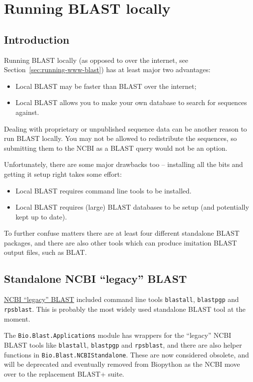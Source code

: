 \documentclass{report}
\begin{document}
\section{Running BLAST locally}
\label{sec:running-local-blast}

\subsection{Introduction}

Running BLAST locally (as opposed to over the internet, see
Section~\ref{sec:running-www-blast}) has at least major two advantages:
\begin{itemize}
\item Local BLAST may be faster than BLAST over the internet;
\item Local BLAST allows you to make your own database to search for sequences against.
\end{itemize}
Dealing with proprietary or unpublished sequence data can be another reason to run BLAST
locally.  You may not be allowed to redistribute the sequences, so submitting them to the
NCBI as a BLAST query would not be an option.

Unfortunately, there are some major drawbacks too -- installing all the bits and getting it setup right takes some effort:
\begin{itemize}
\item Local BLAST requires command line tools to be installed.
\item Local BLAST requires (large) BLAST databases to be setup (and potentially kept up to date).
\end{itemize}

\noindent
To further confuse matters there are at least four different standalone BLAST packages,
and there are also other tools which can produce imitation BLAST output files, such as BLAT.

\subsection{Standalone NCBI ``legacy'' BLAST}

\href{http://blast.ncbi.nlm.nih.gov/Blast.cgi?CMD=Web&PAGE_TYPE=BlastDocs&DOC_TYPE=Download}
{NCBI ``legacy'' BLAST} included command line tools \verb|blastall|, \verb|blastpgp| and
\verb|rpsblast|. This is probably the most widely used standalone BLAST tool at the moment.

The \verb|Bio.Blast.Applications| module has wrappers for the ``legacy'' NCBI BLAST tools
like \verb|blastall|, \verb|blastpgp| and \verb|rpsblast|, and there are also helper
functions in \verb|Bio.Blast.NCBIStandalone|. These are now considered obsolete, and will
be deprecated and eventually removed from Biopython as the NCBI move over to the replacement
BLAST+ suite.
\end{document}
